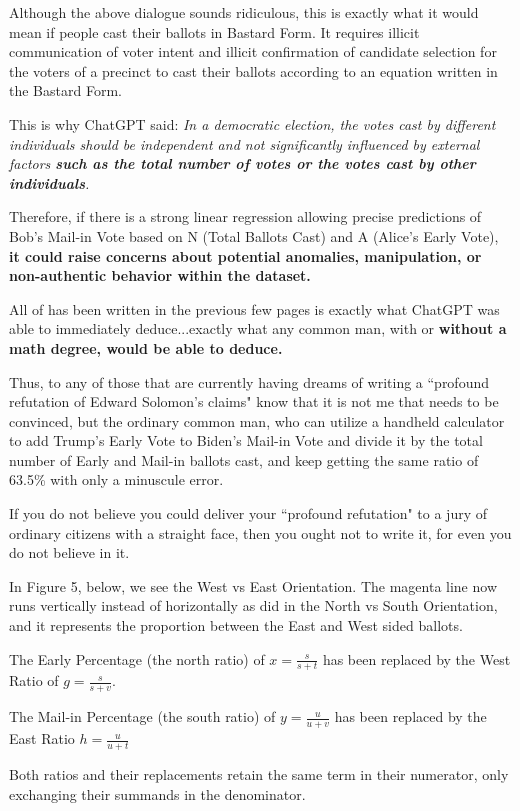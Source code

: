 Although the above dialogue sounds ridiculous, this is exactly what it would mean if people cast their ballots in Bastard Form. It requires illicit communication of voter intent and illicit confirmation of candidate selection for the voters of a precinct to cast their ballots according to an equation written in the Bastard Form. 

This is why ChatGPT said: \textit{In a democratic election, the votes cast by different individuals should be independent and not significantly influenced by external factors \textbf{such as the total number of votes or the votes cast by other individuals}.}

Therefore, if there is a strong linear regression allowing precise predictions of Bob's Mail-in Vote based on N (Total Ballots Cast) and A (Alice's Early Vote), \textbf{it could raise concerns about potential anomalies, manipulation, or non-authentic behavior within the dataset.}

All of has been written in the previous few pages is exactly what ChatGPT was able to immediately deduce...exactly what any common man, with or \textbf{without a math degree, would be able to deduce.}

Thus, to any of those that are currently having dreams of writing a ``profound refutation of Edward Solomon's claims" know that it is not me that needs to be convinced, but the ordinary common man, who can utilize a handheld calculator to add Trump's Early Vote to Biden's Mail-in Vote and divide it by the total number of Early and Mail-in ballots cast, and keep getting the same ratio of 63.5\% with only a minuscule error.

If you do not believe you could deliver your ``profound refutation" to a jury of ordinary citizens with a straight face, then you ought not to write it, for even you do not believe in it.

\newpage
In Figure 5, below, we see the West vs East Orientation. The magenta line now runs vertically instead of horizontally as did in the North vs South Orientation, and it represents the proportion between the East and West sided ballots.

The Early Percentage (the north ratio) of $x=\frac{s}{s+t}$ has been replaced by the West Ratio of $g=\frac{s}{s+v}$.

The Mail-in Percentage (the south ratio) of $y=\frac{u}{u+v}$ has been replaced by the East Ratio $h=\frac{u}{u+t}$

Both ratios and their replacements retain the same term in their numerator, only exchanging their summands in the denominator.

